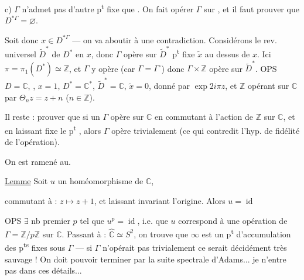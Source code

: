  c) $\Gamma$ n'admet pas d'autre p\textsuperscript{t} fixe que . On fait opérer $\Gamma$  sur , et il faut prouver que $D^{*\Gamma}=\varnothing$.



Soit donc $x\in D^{*\Gamma}$ --- on va aboutir à une contradiction. Considérons le rev. universel $\widetilde D^*$ de $D^*$  en $x$,  donc $\Gamma$ opère sur $\widetilde D^*$  p\textsuperscript{t} fixe $\widetilde x$ au dessus de $x$. Ici $\pi=\pi_1(D^*)\simeq\mathbb Z$, et $\Gamma$ y opère  (car $\Gamma=\Gamma^\circ$) donc $\Gamma\times\mathbb Z$ opère sur $\widetilde D^*$. OPS $D=\mathbb C$, , $x=1$, $D^*=\mathbb C^*$, $\widetilde D^*=\mathbb C$, $\widetilde x=0$,  donné par $\exp 2i\pi z$,  et $\mathbb Z$ opérant sur $\mathbb C$ par $\Theta_nz=z+n$ ($n\in\mathbb Z$).

 Il reste : prouver que si un  $\Gamma$ opère sur $\mathbb C$ en commutant  à l'action de $\mathbb Z$ sur $\mathbb C$, et en laissant  fixe le p\textsuperscript{t} , alors $\Gamma$ opère trivialement (ce qui contredit l'hyp. de fidélité de l'opération).

 On est ramené au.

\uline{Lemme} Soit $u$ un homéomorphisme  de $\mathbb C$,



commutant à : $z\longmapsto z+1$, et laissant invariant l'origine. Alors $u=\operatorname{id}$

OPS  $\exists$ nb premier $p$ tel que $u^p=\operatorname{id}$, i.e. que $u$ correspond à une opération de $\Gamma=\mathbb Z/p\mathbb Z$ sur $\mathbb C$.  Passant à : $\widehat{\mathbb C}\simeq S^2$, on trouve que $\infty$ est un p\textsuperscript{t} d'accumulation des p\textsuperscript{ts} fixes sous $\Gamma$ --- si $\Gamma$ n'opérait pas trivialement ce serait décidément très sauvage ! On doit pouvoir terminer par la suite spectrale d'Adams... je n'entre pas dans ces détails...


